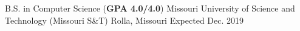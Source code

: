 

\begin{cventries}

  \cventry
    {B.S. in Computer Science (\textbf{GPA 4.0/4.0})} %
    {Missouri University of Science and Technology (Missouri S\&T)} %
    {Rolla, Missouri} %
    {Expected Dec. 2019} %
    {}

\end{cventries}
